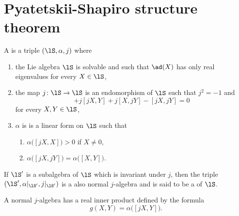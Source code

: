 \section{Pyatetskii-Shapiro structure theorem}
\label{SecPyateskiiShapiro}

\begin{definition}
	A  is a triple $(\lS,\alpha,j)$ where
	\begin{enumerate}

		\item
		      the Lie algebra $\lS$ is solvable and such that $\ad(X)$ has only real eigenvalues for every $X\in\lS$,
		\item
		      the map $j\colon \lS\to \lS$ is an endomorphism of $\lS$ such that $j^2=-1$ and
		      \begin{equation}
			      [X,Y]+j[jX,Y]+j[X,jY]-[jX,jY]=0
		      \end{equation}
		      for every $X,Y\in\lS$,
		\item
		      $\alpha$ is is  a linear form on $\lS$ such that
		      \begin{enumerate}
			      \item
			            $\alpha\big( [jX,X] \big)>0$ if $X\neq 0$,
			      \item
			            $\alpha\big( [jX,jY] \big)=\alpha\big( [X,Y] \big)$.
		      \end{enumerate}

	\end{enumerate}
\end{definition}

If $\lS'$ is a subalgebra of $\lS$ which is invariant under $j$, then the triple $(\lS',\alpha|_{\lS'},j|_{\lS'})$ is a also normal $j$-algebra and is said to be a  of $\lS$.

A normal $j$-algebra has a real inner product defined by the formula
\begin{equation}
	g(X,Y)=\alpha\big( [jX,Y] \big).
\end{equation}

